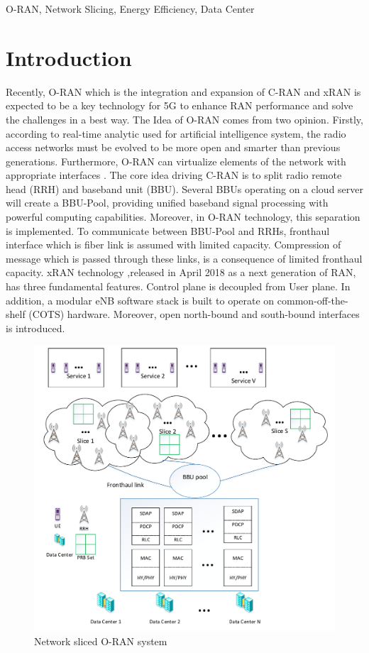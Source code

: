 \documentclass[conference]{IEEEtran}
\begin{document}
\begin{IEEEkeywords}
O-RAN, Network Slicing, Energy Efficiency, Data Center
\end{IEEEkeywords}

\section{Introduction}
Recently, O-RAN which is the integration and expansion of C-RAN and xRAN is expected to be a key technology for 5G to enhance RAN performance and solve the challenges in a best way.  
The Idea of O-RAN comes from two opinion. Firstly, according to real-time analytic used for artificial intelligence system, the radio access networks must be evolved to be more open and smarter than previous generations. Furthermore, O-RAN can virtualize elements of the network with  appropriate interfaces \cite{orant}. \newline
The core idea driving C-RAN is to split radio remote head (RRH) and baseband unit (BBU). Several BBUs operating on a cloud server will create a BBU-Pool, providing unified baseband signal processing with powerful computing capabilities. Moreover, in O-RAN technology, this separation is implemented\cite{cran1}.
To communicate between BBU-Pool and RRHs, fronthaul interface which is fiber link is assumed with limited capacity. Compression of message which is passed through these links, is a consequence of limited fronthaul capacity\cite{frdl,simeone2016cloud,motalleb2017optimal}.\newline
xRAN technology ,released in April 2018 as a next generation of RAN, has three fundamental features. Control plane is decoupled from User plane. In addition, a modular eNB software stack is built to operate on common-off-the-shelf (COTS) hardware. Moreover, open north-bound and south-bound interfaces is introduced\cite{xran}.
\begin{figure}[H]
  \centering
    \includegraphics[scale=0.55]{c3}
  \caption{Network sliced O-RAN system}
  \label{fig:c11}
\end{figure} 
\end{document}
